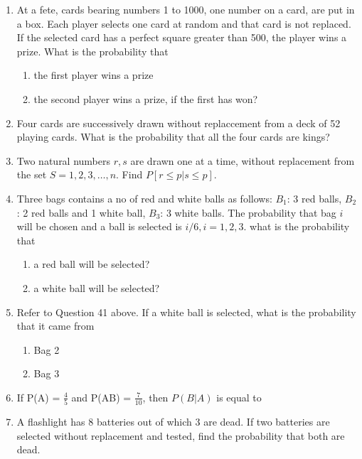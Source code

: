 \begin{enumerate}[label=\thesubsection.\arabic*,ref=\thesubsection.\theenumi]
\\
\solution 

\item At a fete, cards bearing numbers 1 to 1000, one number on a card, are put in a box. Each player selects one card at random and that card is not replaced. If the selected card has a perfect square greater than 500, the player wins a prize. What is the probability that 
\begin{enumerate}
\item the first player wins a prize
\item the second player wins a prize, if the first has won?
\end{enumerate}
\solution

\item Four cards are successively drawn without replaccement from a deck of 52 playing cards. What is the probability that all the four cards are kings?
\\
\solution

\item Two natural numbers $r, s$ are drawn one at a time, without replacement from
the set $S = {1,2,3, \ldots,n}$. Find $P[r\le p|s\le p]$.
\\
\solution 

\item Three bags contains a no of red and white balls as follows:
$B_1$: 3 red balls, $B_2$: 2 red balls and 1 white ball, $B_3$: 3 white balls.
The probability that bag $i$ will be chosen and a ball is selected is $i/6, i=1,2,3$.
what is the probability that
\begin{enumerate}
	\item a red ball will be selected?     
	\item  a white ball will be selected?
\end{enumerate}
\solution

\item Refer to Question 41 above. If a white ball is selected, what is the probability that it came from\\
\begin{enumerate}
\item  Bag 2
\item  Bag 3
\end{enumerate}
\solution
%
\item If P(A) = $\frac{4}{5}$ and P(AB) = $\frac{7}{10}$, then $P(B|A)$ is equal to\\
\solution
%
\item A flashlight has 8 batteries out of which 3 are dead. If two batteries are selected without replacement and tested, find the probability that both are dead.\\

\end{enumerate}

